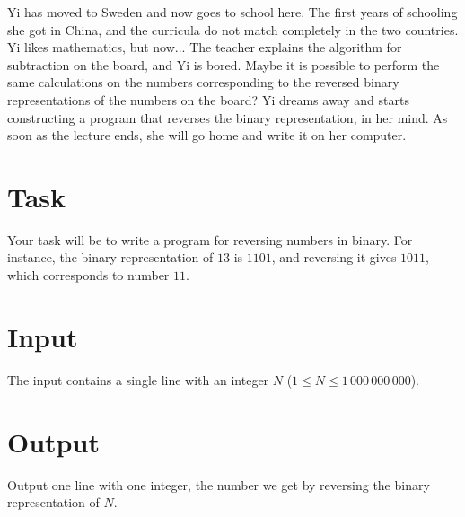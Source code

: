 Yi has moved to Sweden and now goes to school here.
The first years of schooling she got in China, and the curricula do not match completely in the two countries.
Yi likes mathematics, but now...
The teacher explains the algorithm for subtraction on the board, and Yi is bored.
Maybe it is possible to perform the same calculations on the numbers corresponding to the reversed binary representations of the numbers on the board?
Yi dreams away and starts constructing a program that reverses the binary representation, in her mind.
As soon as the lecture ends, she will go home and write it on her computer.

\section*{Task}
Your task will be to write a program for reversing numbers in binary.
For instance, the binary representation of $13$ is $1101$, and reversing it gives $1011$, which corresponds to number $11$.

\section*{Input}
The input contains a single line with an integer $N$ ($1 \le N \le 1\,000\,000\,000$).

\section*{Output}
Output one line with one integer, the number we get by reversing the binary representation of $N$.
